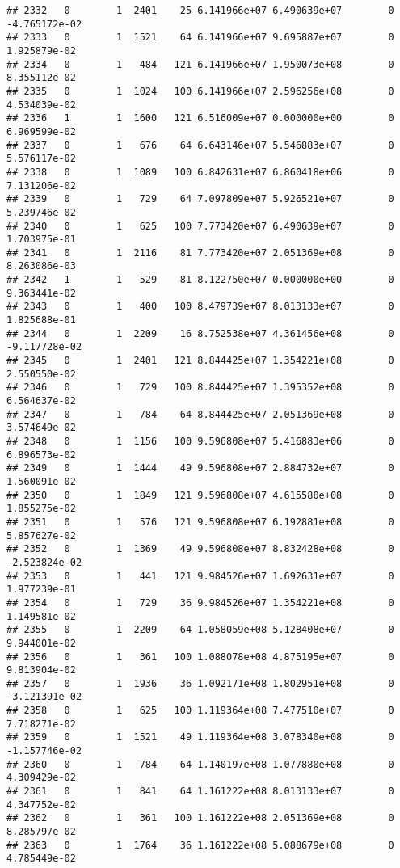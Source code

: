 \documentclass[
]{article}
\begin{document}
\begin{enumerate}
\begin{verbatim}
## 2332   0        1  2401    25 6.141966e+07 6.490639e+07        0 -4.765172e-02
## 2333   0        1  1521    64 6.141966e+07 9.695887e+07        0  1.925879e-02
## 2334   0        1   484   121 6.141966e+07 1.950073e+08        0  8.355112e-02
## 2335   0        1  1024   100 6.141966e+07 2.596256e+08        0  4.534039e-02
## 2336   1        1  1600   121 6.516009e+07 0.000000e+00        0  6.969599e-02
## 2337   0        1   676    64 6.643146e+07 5.546883e+07        0  5.576117e-02
## 2338   0        1  1089   100 6.842631e+07 6.860418e+06        0  7.131206e-02
## 2339   0        1   729    64 7.097809e+07 5.926521e+07        0  5.239746e-02
## 2340   0        1   625   100 7.773420e+07 6.490639e+07        0  1.703975e-01
## 2341   0        1  2116    81 7.773420e+07 2.051369e+08        0  8.263086e-03
## 2342   1        1   529    81 8.122750e+07 0.000000e+00        0  9.363441e-02
## 2343   0        1   400   100 8.479739e+07 8.013133e+07        0  1.825688e-01
## 2344   0        1  2209    16 8.752538e+07 4.361456e+08        0 -9.117728e-02
## 2345   0        1  2401   121 8.844425e+07 1.354221e+08        0  2.550550e-02
## 2346   0        1   729   100 8.844425e+07 1.395352e+08        0  6.564637e-02
## 2347   0        1   784    64 8.844425e+07 2.051369e+08        0  3.574649e-02
## 2348   0        1  1156   100 9.596808e+07 5.416883e+06        0  6.896573e-02
## 2349   0        1  1444    49 9.596808e+07 2.884732e+07        0  1.560091e-02
## 2350   0        1  1849   121 9.596808e+07 4.615580e+08        0  1.855275e-02
## 2351   0        1   576   121 9.596808e+07 6.192881e+08        0  5.857627e-02
## 2352   0        1  1369    49 9.596808e+07 8.832428e+08        0 -2.523824e-02
## 2353   0        1   441   121 9.984526e+07 1.692631e+07        0  1.977239e-01
## 2354   0        1   729    36 9.984526e+07 1.354221e+08        0  1.149581e-02
## 2355   0        1  2209    64 1.058059e+08 5.128408e+07        0  9.944001e-02
## 2356   0        1   361   100 1.088078e+08 4.875195e+07        0  9.813904e-02
## 2357   0        1  1936    36 1.092171e+08 1.802951e+08        0 -3.121391e-02
## 2358   0        1   625   100 1.119364e+08 7.477510e+07        0  7.718271e-02
## 2359   0        1  1521    49 1.119364e+08 3.078340e+08        0 -1.157746e-02
## 2360   0        1   784    64 1.140197e+08 1.077880e+08        0  4.309429e-02
## 2361   0        1   841    64 1.161222e+08 8.013133e+07        0  4.347752e-02
## 2362   0        1   361   100 1.161222e+08 2.051369e+08        0  8.285797e-02
## 2363   0        1  1764    36 1.161222e+08 5.088679e+08        0  4.785449e-02

\end{verbatim}
\end{enumerate}
\end{document}
